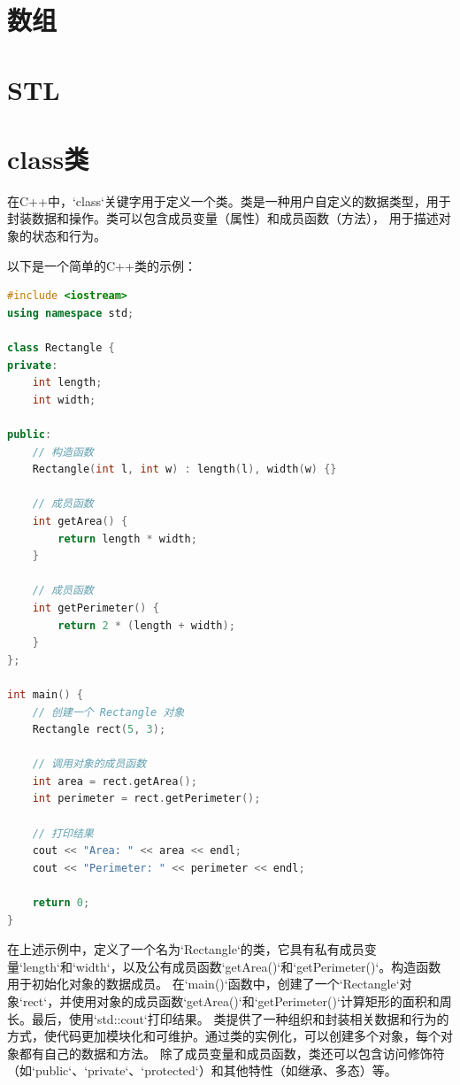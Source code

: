 \documentclass[12pt,twiside,a4paper]{ctexbook}
\numberwithin{chapter}{part}
\begin{document}
\chapter{数组}

\chapter{STL}

\chapter{class类}
在C++中，`class`关键字用于定义一个类。类是一种用户自定义的数据类型，用于封装数据和操作。类可以包含成员变量（属性）和成员函数（方法），
用于描述对象的状态和行为。

以下是一个简单的C++类的示例：

\begin{lstlisting}[language=C++]
#include <iostream>
using namespace std;

class Rectangle {
private:
    int length;
    int width;

public:
    // 构造函数
    Rectangle(int l, int w) : length(l), width(w) {}

    // 成员函数
    int getArea() {
        return length * width;
    }

    // 成员函数
    int getPerimeter() {
        return 2 * (length + width);
    }
};

int main() {
    // 创建一个 Rectangle 对象
    Rectangle rect(5, 3);

    // 调用对象的成员函数
    int area = rect.getArea();
    int perimeter = rect.getPerimeter();

    // 打印结果
    cout << "Area: " << area << endl;
    cout << "Perimeter: " << perimeter << endl;

    return 0;
}
\end{lstlisting}
在上述示例中，定义了一个名为`Rectangle`的类，它具有私有成员变量`length`和`width`，以及公有成员函数`getArea()`和`getPerimeter()`。构造函数用于初始化对象的数据成员。
在`main()`函数中，创建了一个`Rectangle`对象`rect`，并使用对象的成员函数`getArea()`和`getPerimeter()`计算矩形的面积和周长。最后，使用`std::cout`打印结果。
类提供了一种组织和封装相关数据和行为的方式，使代码更加模块化和可维护。通过类的实例化，可以创建多个对象，每个对象都有自己的数据和方法。
除了成员变量和成员函数，类还可以包含访问修饰符（如`public`、`private`、`protected`）和其他特性（如继承、多态）等。
\end{document}
